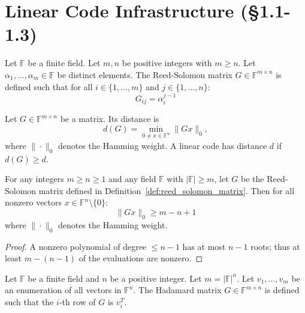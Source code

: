 \section*{Linear Code Infrastructure (§1.1-1.3)}

\begin{definition}\label{def:reed_solomon_matrix}\leanok
Let $\mathbb{F}$ be a finite field. Let $m, n$ be positive integers with $m \geq n$. Let $\alpha_1, \ldots, \alpha_m \in \mathbb{F}$ be distinct elements.
The Reed-Solomon matrix $G \in \mathbb{F}^{m \times n}$ is defined such that for all $i \in \{1, \ldots, m\}$ and $j \in \{1, \ldots, n\}$:
\[ G_{ij} = \alpha_i^{j-1} \]
\end{definition}

\begin{definition}\label{def:code_distance}\leanok
Let $G \in \mathbb{F}^{m \times n}$ be a matrix. Its distance is
\[
  d(G) = \min_{0 \neq x \in \mathbb{F}^n} \|Gx\|_0,
\]
where $\|\cdot\|_0$ denotes the Hamming weight. A linear code has distance $d$ if $d(G) \geq d$.
\end{definition}

\begin{lemma}\label{lem:reed_solomon_distance}\leanok {}
For any integers $m \geq n \geq 1$ and any field $\mathbb{F}$ with $|\mathbb{F}| \geq m$, let $G$ be the Reed-Solomon matrix defined in Definition~\ref{def:reed_solomon_matrix}.
Then for all nonzero vectors $x \in \mathbb{F}^n \setminus \{0\}$:
\[ \|Gx\|_0 \geq m - n + 1 \]
where $\|\cdot\|_0$ denotes the Hamming weight.
\end{lemma}
\begin{proof} \leanok
A nonzero polynomial of degree $\leq n-1$ has at most $n-1$ roots; thus at least $m-(n-1)$ of the evaluations are nonzero.
\end{proof}

\begin{definition}\label{def:hadamard_matrix}\leanok
Let $\mathbb{F}$ be a finite field and $n$ be a positive integer. Let $m = |\mathbb{F}|^n$. Let $v_1, \ldots, v_m$ be an enumeration of all vectors in $\mathbb{F}^n$.
The Hadamard matrix $G \in \mathbb{F}^{m \times n}$ is defined such that the $i$-th row of $G$ is $v_i^T$.
\end{definition}

